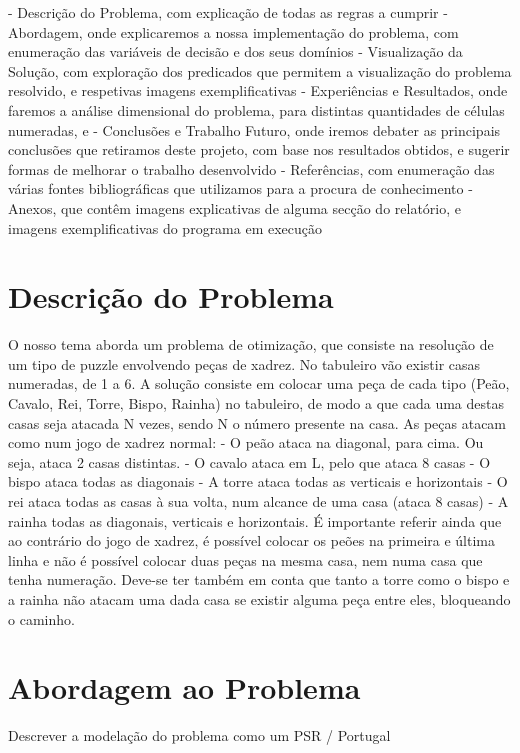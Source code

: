 \documentclass[runningheads]{llncs}
\begin{document}
 - Descrição do Problema, com explicação de todas as regras a cumprir
 - Abordagem, onde explicaremos a nossa implementação do problema, com enumeração das variáveis de decisão e dos seus domínios
 - Visualização da Solução, com exploração dos predicados que permitem a visualização do problema resolvido, e respetivas imagens exemplificativas
 - Experiências e Resultados, onde faremos a análise dimensional do problema, para distintas quantidades de células numeradas, e  
 - Conclusões e Trabalho Futuro, onde iremos debater as principais conclusões que retiramos deste projeto, com base nos resultados obtidos, e sugerir formas de melhorar o trabalho desenvolvido
 - Referências, com enumeração das várias fontes bibliográficas que utilizamos para a procura de conhecimento
 - Anexos, que contêm imagens explicativas de alguma secção do relatório, e imagens exemplificativas do programa em execução

\section{Descrição do Problema}
O nosso tema aborda um problema de otimização, que consiste na resolução de um tipo de puzzle envolvendo peças de xadrez. No tabuleiro vão existir casas numeradas, de 1 a 6. A solução consiste em colocar uma peça de cada tipo (Peão, Cavalo, Rei, Torre, Bispo, Rainha) no tabuleiro, de modo a que cada uma destas casas seja
atacada N vezes, sendo N o número presente na casa. As peças atacam como num jogo de xadrez normal:
 - O peão ataca na diagonal, para cima. Ou seja, ataca 2 casas distintas.
 - O cavalo ataca em L, pelo que ataca 8 casas 
 - O bispo ataca todas as diagonais
 - A torre ataca todas as verticais e horizontais
 - O rei ataca todas as casas à sua volta, num alcance de uma casa (ataca 8 casas)
 - A rainha todas as diagonais, verticais e horizontais.
É importante referir ainda que ao contrário do jogo de xadrez, é possível colocar os peões 
na primeira e última linha e não é possível colocar duas peças na mesma casa, nem numa casa que tenha numeração.
Deve-se ter também em conta que tanto a torre como o bispo e a rainha não atacam uma dada casa se existir alguma peça entre eles, bloqueando o caminho.

\newpage
\section{Abordagem ao Problema}
Descrever a modelação do problema como um PSR / Portugal
\end{document}

